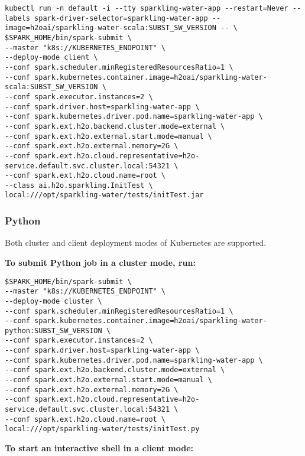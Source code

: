 \begin{lstlisting}[style=Bash]
kubectl run -n default -i --tty sparkling-water-app --restart=Never --labels spark-driver-selector=sparkling-water-app --image=h2oai/sparkling-water-scala:SUBST_SW_VERSION -- \
$SPARK_HOME/bin/spark-submit \
--master "k8s://KUBERNETES_ENDPOINT" \
--deploy-mode client \
--conf spark.scheduler.minRegisteredResourcesRatio=1 \
--conf spark.kubernetes.container.image=h2oai/sparkling-water-scala:SUBST_SW_VERSION \
--conf spark.executor.instances=2 \
--conf spark.driver.host=sparkling-water-app \
--conf spark.kubernetes.driver.pod.name=sparkling-water-app \
--conf spark.ext.h2o.backend.cluster.mode=external \
--conf spark.ext.h2o.external.start.mode=manual \
--conf spark.ext.h2o.external.memory=2G \
--conf spark.ext.h2o.cloud.representative=h2o-service.default.svc.cluster.local:54321 \
--conf spark.ext.h2o.cloud.name=root \
--class ai.h2o.sparkling.InitTest \
local:///opt/sparkling-water/tests/initTest.jar
\end{lstlisting}


\subsubsection{Python}

Both cluster and client deployment modes of Kubernetes are supported.

\textbf{To submit Python job in a cluster mode, run:}

\begin{lstlisting}[style=Bash]
$SPARK_HOME/bin/spark-submit \
--master "k8s://KUBERNETES_ENDPOINT" \
--deploy-mode cluster \
--conf spark.scheduler.minRegisteredResourcesRatio=1 \
--conf spark.kubernetes.container.image=h2oai/sparkling-water-python:SUBST_SW_VERSION \
--conf spark.executor.instances=2 \
--conf spark.driver.host=sparkling-water-app \
--conf spark.kubernetes.driver.pod.name=sparkling-water-app \
--conf spark.ext.h2o.backend.cluster.mode=external \
--conf spark.ext.h2o.external.start.mode=manual \
--conf spark.ext.h2o.external.memory=2G \
--conf spark.ext.h2o.cloud.representative=h2o-service.default.svc.cluster.local:54321 \
--conf spark.ext.h2o.cloud.name=root \
local:///opt/sparkling-water/tests/initTest.py
\end{lstlisting}

\textbf{To start an interactive shell in a client mode:}

